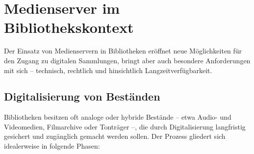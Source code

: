 \documentclass[12pt,a4paper]{report}
\begin{document}
\section{Medienserver im Bibliothekskontext}  
Der Einsatz von Medienservern in Bibliotheken eröffnet neue Möglichkeiten für den Zugang zu digitalen Sammlungen, bringt aber auch besondere Anforderungen mit sich – technisch, rechtlich und hinsichtlich Langzeitverfügbarkeit.

  \subsection{Digitalisierung von Beständen}  
  Bibliotheken besitzen oft analoge oder hybride Bestände – etwa Audio- und Videomedien, Filmarchive oder Tonträger –, die durch Digitalisierung langfristig gesichert und zugänglich gemacht werden sollen. Der Prozess gliedert sich idealerweise in folgende Phasen:
\end{document}
